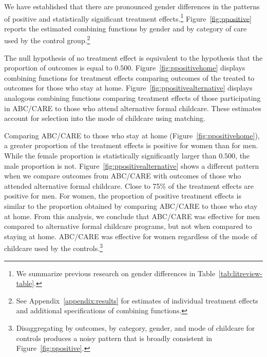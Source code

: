 We have established that there are pronounced gender differences in the patterns of positive and statistically significant treatment effects.\footnote{We summarize previous research on gender differences in Table~\ref{tab:litreview-table}.} Figure~\ref{fig:ppositive} reports the estimated combining functions by gender and by category of care used by the control group.\footnote{See Appendix~\ref{appendix:results} for estimates of individual treatment effects and additional specifications of combining functions.}

The null hypothesis  of no treatment effect is equivalent to the hypothesis that the proportion of outcomes is equal to $0.500$. Figure~\ref{fig:ppositivehome} displays combining functions for treatment effects comparing outcomes of the treated to outcomes for those who stay at home. Figure~\ref{fig:ppositivealternative} displays analogous combining functions comparing treatment effects of those participating in ABC/CARE to those who attend alternative formal childcare. These estimates account for selection into the mode of childcare using matching.

Comparing ABC/CARE to those who stay at home (Figure~\ref{fig:ppositivehome}), a greater proportion of the treatment effects is positive for women than for men. While the female proportion is statistically significantly larger than $0.500$, the male proportion is not. Figure~\ref{fig:ppositivealternative} shows a different pattern when we compare outcomes from ABC/CARE with outcomes of those who attended alternative formal childcare. Close to 75\% of the treatment effects are positive for men. For women, the proportion of positive treatment effects is similar to the proportion obtained by comparing ABC/CARE to those who stay at home. From this analysis, we conclude that ABC/CARE was effective for men compared to alternative formal childcare programs, but not when compared to staying at home. ABC/CARE was effective for women regardless of the mode of childcare used by the controls.\footnote{Disaggregating by outcomes, by category, gender, and mode of childcare for controls produces a noisy pattern that is broadly consistent in Figure~\ref{fig:ppositive}.}

